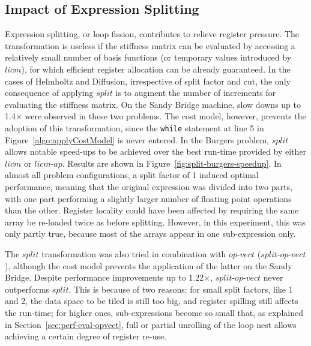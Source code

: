 \documentclass[conference]{IEEEtran}
\begin{document}
\subsection{Impact of Expression Splitting}
\label{sec:perf-results-split}
Expression splitting, or loop fission, contributes to relieve register pressure. The transformation is useless if the stiffness matrix can be evaluated by accessing a relatively small number of basis functions (or temporary values introduced by $licm$), for which efficient register allocation can be already guaranteed. In the cases of Helmholtz and Diffusion, irrespective of split factor and cut, the only consequence of applying $split$ is to augment the number of increments for evaluating the stiffness matrix. On the Sandy Bridge machine, slow downs up to 1.4$\times$ were observed in these two problems. The cost model, however, prevents the adoption of this transformation, since the \texttt{while} statement at line 5 in Figure~\ref{algo:applyCostModel} is never entered. In the Burgers problem, $split$ allows notable speed-ups to be achieved over the best run-time provided by either $licm$ or $licm$-$ap$. Results are shown in Figure~\ref{fig:split-burgers-speedup}. In almost all problem configurations, a split factor of 1 induced optimal performance, meaning that the original expression was divided into two parts, with one part performing a slightly larger number of floating point operations than the other. Register locality could have been affected by requiring the same array be re-loaded twice as before splitting. However, in this experiment, this was only partly true, because most of the arrays appear in one sub-expression only.

The $split$ transformation was also tried in combination with $op$-$vect$ ($split$-$op$-$vect$), although the cost model prevents the application of the latter on the Sandy Bridge. Despite performance improvements up to 1.22$\times$, $split$-$op$-$vect$ never outperforms $split$. This is because of two reasons: for small split factors, like 1 and 2, the data space to be tiled is still too big, and register spilling still affects the run-time; for higher ones, sub-expressions become so small that, as explained in Section~\ref{sec:perf-eval-opvect}, full or partial unrolling of the loop nest allows achieving a certain degree of register re-use.
\end{document}
